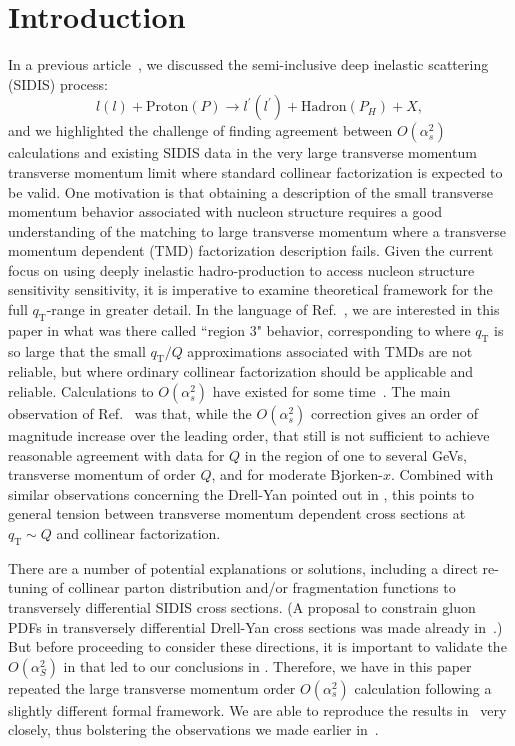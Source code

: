 \documentclass[prd,preprintnumbers,nofootinbib,superscriptaddress,onecolumn,preprint]{revtex4-1}
\newcommand\3[1]{\boldsymbol{#1}}
\newcommand{\Tsc}[2]{#1_{#2\text{T}}}
\newcommand{\parz}[1]{\ensuremath{\left(#1\right)}}
\newcommand{\order}[1]{\ensuremath{O\parz{#1}}}
\begin{document}
\section{Introduction}
In a previous article~\cite{Gonzalez-Hernandez:2018ipj}, we discussed
the semi-inclusive deep inelastic scattering (SIDIS) process: $$l(l) +
\text{Proton}(P) \to l^{\prime}(l^{\prime})+\text{Hadron}(P_H) + X,$$
and we highlighted the challenge of finding agreement between
$\order{\alpha_s^2}$ calculations and existing SIDIS data in the very large
transverse momentum transverse momentum limit where standard collinear
factorization is expected to be valid.  One motivation is that obtaining a  
description of the small transverse momentum behavior associated with 
nucleon structure requires a good understanding of the matching to large 
transverse momentum where a transverse momentum dependent (TMD) 
factorization description fails. 
Given the current focus on using deeply inelastic 
hadro-production to access nucleon structure sensitivity sensitivity,
it is imperative to 
examine theoretical framework for the full $\Tsc{q}{}$-range in greater detail.  In the 
language of Ref.~\cite{Gonzalez-Hernandez:2018ipj}, we are interested in this paper in 
what was there called ``region 3" behavior, corresponding to where $\Tsc{q}{}$ is so 
large that the small $\Tsc{q}{}/Q$ approximations associated with TMDs are not reliable, 
but where ordinary collinear factorization should be applicable and reliable.  
Calculations to $\order{\alpha_s^2}$ have existed for some 
time~\cite{Daleo:2004pn,Kniehl:2004hf}.  The main observation of 
Ref.~\cite{Gonzalez-Hernandez:2018ipj} was that, while the $\order{\alpha_s^2}$ 
correction gives an order of magnitude increase over the leading order, that still is not 
sufficient to achieve reasonable agreement with data for $Q$ in the region of one to 
several GeVs, transverse momentum of order $Q$, and for moderate Bjorken-$x$. 
Combined with similar observations concerning the Drell-Yan pointed out in 
\cite{Bacchetta:2019tcu}, this points to general tension between transverse momentum 
dependent cross sections at $\Tsc{q}{} \sim Q$ and collinear factorization. 

There are a number of potential explanations or solutions, including
a direct re-tuning of collinear parton distribution and/or
fragmentation functions to transversely differential SIDIS cross
sections. (A proposal to constrain gluon PDFs in transversely differential 
Drell-Yan cross sections was made already in~\cite{Berger:1998ev}.)
But before proceeding to consider these directions, 
it is important to validate the $O(\alpha_S^2)$ in \cite{Daleo:2004pn,Kniehl:2004hf}
that led to our conclusions in \cite{Gonzalez-Hernandez:2018ipj}.
%
Therefore, we have in this paper repeated the large transverse
momentum order $\order{\alpha_s^2}$ calculation following a slightly
different formal framework.  We are able to reproduce the results
in~\cite{Daleo:2004pn} very closely, thus bolstering the observations
we made earlier in~\cite{Gonzalez-Hernandez:2018ipj}. 
\end{document}
